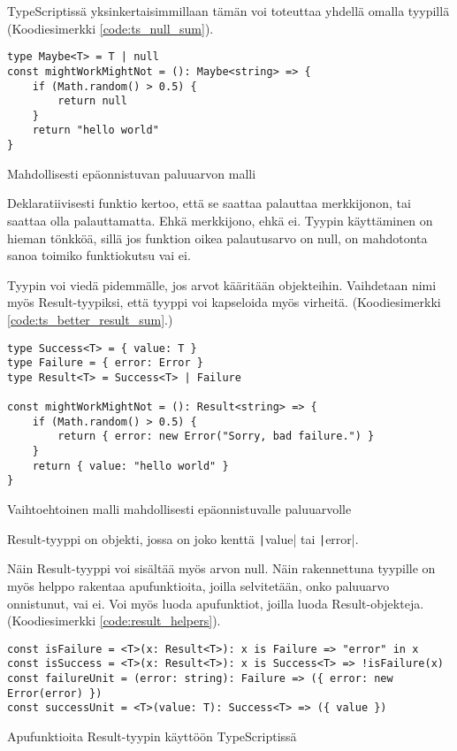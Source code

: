 TypeScriptissä yksinkertaisimmillaan tämän voi toteuttaa yhdellä omalla tyypillä (Koodiesimerkki \ref{code:ts_null_sum}).

\begin{code}
    \begin{verbatim}
type Maybe<T> = T | null
const mightWorkMightNot = (): Maybe<string> => {
    if (Math.random() > 0.5) {
        return null
    }
    return "hello world"
}
    \end{verbatim}
    \caption{Mahdollisesti epäonnistuvan paluuarvon malli}
    \label{code:ts_null_sum}
\end{code}

Deklaratiivisesti funktio kertoo, että se saattaa palauttaa merkkijonon, tai saattaa olla palauttamatta. Ehkä merkkijono, ehkä ei.
Tyypin käyttäminen on hieman tönkköä, sillä jos funktion oikea palautusarvo on null, on mahdotonta sanoa toimiko funktiokutsu vai ei.

Tyypin voi viedä pidemmälle, jos arvot kääritään objekteihin. Vaihdetaan nimi myös Result-tyypiksi, että tyyppi voi kapseloida myös virheitä. (Koodiesimerkki \ref{code:ts_better_result_sum}.)

\begin{code}
    \begin{verbatim}
type Success<T> = { value: T }
type Failure = { error: Error }
type Result<T> = Success<T> | Failure 

const mightWorkMightNot = (): Result<string> => {
    if (Math.random() > 0.5) {
        return { error: new Error("Sorry, bad failure.") }
    }
    return { value: "hello world" }
}
    \end{verbatim}
    \caption{Vaihtoehtoinen malli mahdollisesti epäonnistuvalle paluuarvolle}
    \label{code:ts_better_result_sum}
\end{code}


Result-tyyppi on objekti, jossa on joko kenttä \texttt|value| tai \texttt|error|.

Näin Result-tyyppi voi sisältää myös arvon null. Näin rakennettuna tyypille on myös helppo rakentaa apufunktioita, joilla selvitetään, onko paluuarvo onnistunut, vai ei. Voi myös luoda apufunktiot, joilla luoda Result-objekteja. (Koodiesimerkki \ref{code:result_helpers}).

\begin{code}
    \begin{verbatim}
const isFailure = <T>(x: Result<T>): x is Failure => "error" in x
const isSuccess = <T>(x: Result<T>): x is Success<T> => !isFailure(x)
const failureUnit = (error: string): Failure => ({ error: new Error(error) })
const successUnit = <T>(value: T): Success<T> => ({ value })
    \end{verbatim}
    \caption{Apufunktioita Result-tyypin käyttöön TypeScriptissä}
    \label{code:result_helpers}
\end{code}

